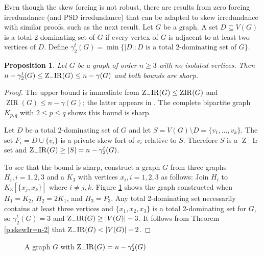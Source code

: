 \documentclass{article}
\numberwithin{figure}{section}
\numberwithin{table}{section}
\numberwithin{equation}{section}
\newtheorem{prop}[thm]{Proposition}
\theoremstyle{definition}
\theoremstyle{definition}
\theoremstyle{definition}
\newcommand{\bpf}{\begin{proof}}
\newcommand{\epf}{\end{proof}\ms}
\newcommand{\ms}{\medskip}
\newcommand{\Zs}{\operatorname{Z}_-}
\newcommand{\DtTwo}{\gamma^t_2}
\DeclareMathOperator{\ZIR}{ZIR}
\newcommand{\ZsIR}{\Zs\!{\rm IR}}
\begin{document}
 
Even though the skew forcing is not robust, there are  results from zero forcing irredundance (and PSD irredundance) that can be adapted to skew irredundance with similar proofs, such as  the next result. 
Let $G$ be a graph.  A set $D\subseteq V(G)$ is a  total 2-dominating set of $G$ if every vertex of $G$ is adjacent to at least two vertices of $D$.  Define  $\DtTwo(G)=\min\{|D|: D \mbox{ is a total 2-dominating set of }G\}$. 

\begin{prop}\label{p:2dom-skew}
Let $G$ be a graph of order $n\ge 3$ with no isolated vertices. 
Then 
$ n-\DtTwo(G)\le \ZsIR(G) \le n-\gamma(G)$  
and both bounds are sharp.
\end{prop}
\bpf 
The upper bound is immediate from  $\ZsIR(G)\le\ZIR(G)$  and $\ZIR(G)\le n-\gamma(G)$; the latter appears in  \cite{ZIR}. The complete bipartite graph $K_{p,q}$ with $2\le p\le q$ shows this bound is sharp.


Let $D$ be a total 2-dominating set of $G$ and let $S = V(G)\setminus D = \{v_1,\dots,v_k\}$. The set $F_i = D\cup\{v_i\}$ is a private skew fort of $v_i$ relative to $S$. 
Therefore $S$ is a $\Zs$Ir-set and $\ZsIR(G)\geq |S|=n-\DtTwo(G)$. 

To see that  the bound is sharp,   construct a graph $G$ from three graphs $H_i, i=1,2,3$ and a $K_3$ with vertices $x_i,i=1,2,3$ as follows: Join $H_i$ to $K_3[\{x_j,x_k\}]$ where $i\ne j,k$.
Figure \ref{f:Dt2} shows the  graph constructed when $H_1=K_2$, $H_2=2K_1$, and $H_3=P_3$.  Any total 2-dominating set necessarily contains at least three vertices and  $\{x_1,x_2,x_3\}$ is a total 2-dominating set for $G$, so $\DtTwo(G)=3$ and $\ZsIR(G)\ge |V(G)|-3$. It follows from Theorem \ref{p:skewIr=n-2} that $\ZsIR(G)< |V(G)|-2$.
\epf


\begin{figure}[h!]\centering 	     


\caption{\label{f:Dt2} A graph $G$ with $\ZsIR(G)= n-\DtTwo(G)$}  \end{figure}
\end{document}
